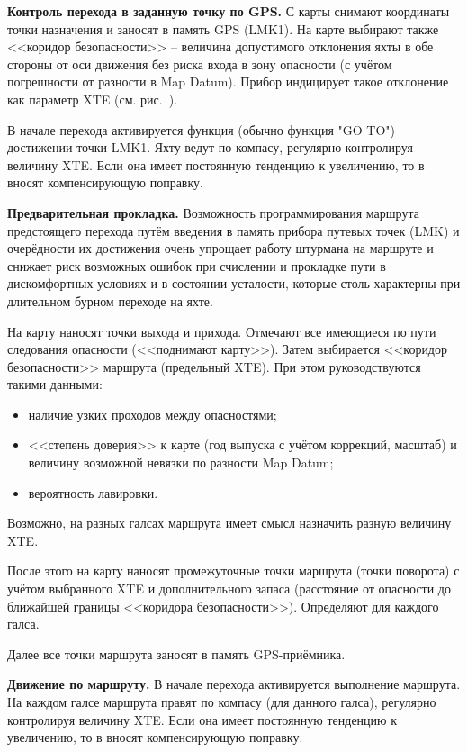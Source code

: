 \textbf{Контроль перехода в заданную точку по GPS.} С карты снимают координаты точки назначения и заносят в память GPS (LMK1). На карте выбирают также <<коридор безопасности>> \--- величина допустимого отклонения яхты в обе стороны от оси движения без риска входа в зону опасности (с учётом погрешности от разности в Map Datum). Прибор индицирует такое отклонение как параметр XTE (см. рис.~). 

В начале перехода активируется функция (обычно функция "GO TO") достижении точки LMK1. Яхту ведут по компасу, регулярно контролируя величину XTE. Если она имеет постоянную тенденцию к увеличению, то в \KK вносят компенсирующую поправку.

\textbf{Предварительная прокладка.} Возможность программирования маршрута предстоящего перехода путём введения в память прибора путевых точек (LMK) и очерёдности их достижения очень упрощает работу штурмана на маршруте и снижает риск возможных ошибок при счислении и прокладке пути в дискомфортных условиях и в состоянии усталости, которые столь характерны при длительном бурном переходе на яхте. 

На карту наносят точки выхода и прихода. Отмечают все имеющиеся по пути следования опасности (<<поднимают карту>>). 
Затем выбирается <<коридор безопасности>> маршрута (предельный XTE). При этом руководствуются такими данными: 

\begin{itemize}
\item наличие узких проходов между опасностями; 
\item <<степень доверия>> к карте (год выпуска с учётом коррекций, масштаб) и величину возможной невязки по разности Map Datum; 
\item вероятность лавировки. 
\end{itemize}

Возможно, на разных галсах маршрута имеет смысл назначить разную величину XTE. 

После этого на карту наносят промежуточные точки маршрута (точки поворота) с учётом выбранного XTE и дополнительного запаса (расстояние от опасности до ближайшей границы <<коридора безопасности>>). Определяют \KK для каждого галса. 

Далее все точки маршрута заносят в память GPS-приёмника. 

\textbf{Движение по маршруту.} В начале перехода активируется выполнение маршрута. На каждом галсе маршрута правят по компасу (\KK для данного галса), регулярно контролируя величину XTE. Если она имеет постоянную тенденцию к увеличению, то в \KK вносят компенсирующую поправку. 

